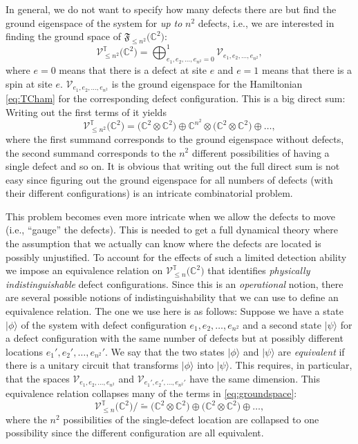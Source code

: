 In general, we do not want to specify how many defects there are but find the ground eigenspace of the system for \emph{up to} $n^2$ defects, i.e., we are interested in finding the ground space of $\mathfrak{F}_{\le n^2}\big(\mathbb{C}^2\big)$:
	\begin{equation}
		\mathcal{V}_{\le n^2}^\mathbb{T}\big(\mathbb{C}^2\big)=\bigoplus_{e_1,e_2,\dots,e_{n^2}=0}^1\mathcal{V}_{e_1,e_2,\dots,e_{n^2}},
	\end{equation}
where $e=0$ means that there is a defect at site $e$ and $e=1$ means that there is a spin at site $e$. $\mathcal{V}_{e_1,e_2,\dots,e_{n^2}}$ is the ground eigenspace for the Hamiltonian \cref{eq:TCham} for the corresponding defect configuration. This is a big direct sum: Writing out the first terms of it yields
	\begin{equation}
	\label{eq:groundspace}
		\mathcal{V}_{\le n^2}^\mathbb{T}\big(\mathbb{C}^2\big)=\big(\mathbb{C}^2\otimes\mathbb{C}^2\big)\oplus\mathbb{C}^{n^2}\otimes\big(\mathbb{C}^2\otimes\mathbb{C}^2\big)\oplus\dots,
	\end{equation}
where the first summand corresponds to the ground eigenspace without defects, the second summand corresponds to the $n^2$ different possibilities of having a single defect and so on. It is obvious that writing out the full direct sum is not easy since figuring out the ground eigenspace for all numbers of defects (with their different configurations) is an intricate combinatorial problem. 

This problem becomes even more intricate when we allow the defects to move (i.e., ``gauge'' the defects). This is needed to get a full dynamical theory where the assumption that we actually can know where the defects are located is possibly unjustified. To account for the effects of such a limited detection ability we impose an equivalence relation on $\mathcal{V}_{\le n}^\mathbb{T}\big(\mathbb{C}^2\big)$ that identifies \emph{physically indistinguishable} defect configurations. Since this is an \emph{operational} notion, there are several possible notions of indistinguishability that we can use to define an equivalence relation. The one we use here is as follows: Suppose we have a state $|\phi\rangle$ of the system with defect configuration $e_1,e_2,\dots,e_{n^2}$ and a second state $|\psi\rangle$ for a defect configuration with the same number of defects but at possibly different locations $e_1',e_2',\dots,e_{n^2}'$. We say that the two states $|\phi\rangle$ and $|\psi\rangle$ are \emph{equivalent} if there is a unitary circuit that transforms $|\phi\rangle$ into $|\psi\rangle$. This requires, in particular, that the spaces $\mathcal{V}_{e_1,e_2,\dots,e_{n^2}}$ and $\mathcal{V}_{e_1',e_2',\dots,e_{n^2}'}$ have the same dimension. This equivalence relation collapses many of the terms in \cref{eq:groundspace}:
	\begin{equation}
		\mathcal{V}_{\le n}^\mathbb{T}\big(\mathbb{C}^2\big)/\tilde=\big(\mathbb{C}^2\otimes\mathbb{C}^2\big)\oplus\big(\mathbb{C}^2\otimes\mathbb{C}^2\big)\oplus\dots,
	\end{equation}
where the $n^2$ possibilities of the single-defect location are collapsed to one possibility since the different configuration are all equivalent.

